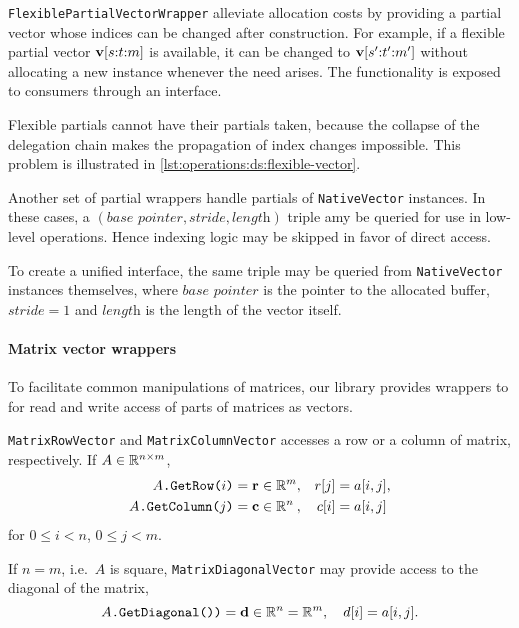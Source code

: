 \texttt{FlexiblePartialVectorWrapper} alleviate allocation costs by
providing a partial vector whose indices can be changed after
construction. For example, if a flexible partial vector
$\bm{\mathrm{v}}[s{:}t{:}m]$ is available, it can be changed to
$\bm{\mathrm{v}}[s'{:}t'{:}m']$ without allocating a new instance
whenever the need arises. The functionality is exposed to consumers
through an interface.

Flexible partials cannot have their partials taken, because the
collapse of the delegation chain makes the propagation of index
changes impossible. This problem is illustrated in
\cref{lst:operations:ds:flexible-vector}.

Another set of partial wrappers handle partials of
\texttt{NativeVector} instances. In these cases, a
$(\textit{base pointer}, \textit{stride}, \textit{length})$ triple amy
be queried for use in low-level operations. Hence indexing logic may
be skipped in favor of direct access.

To create a unified interface, the same triple may be queried from
\texttt{NativeVector} instances themselves, where $\textit{base
  pointer}$ is the pointer to the allocated buffer, $\textit{stride} =
1$ and $\textit{length}$ is the length of the vector itself.

\paragraph{Matrix vector wrappers}

To facilitate common manipulations of matrices, our library provides
wrappers to for read and write access of parts of matrices as
vectors.

\texttt{MatrixRowVector} and \texttt{MatrixColumnVector} accesses a
row or a column of matrix, respectively. If $A \in \mathbb{R}^{n \times m}$,
\begin{align}
  \texttt{$A$.GetRow($i$)} = \mathrlap{\vec{r}}\phantom{\vec{c}} \in \RR^m, \quad
  &r[j] = a[i, j] \text,\\
  \texttt{$A$.GetColumn($j$)} = \vec{c} \in \RR^{\mathrlap{n}\phantom{m}}, \quad
  &\phantom{r[j]}\mathllap{c[i]} = a[i, j]
\end{align}
for $0 \le i < n$, $0 \le j < m$.

If $n = m$, i.e.~$A$ is square, \texttt{MatrixDiagonalVector} may
provide access to the diagonal of the matrix,
\begin{equation}
  \texttt{$A$.GetDiagonal())} = \bm{\mathrm{d}} \in \mathbb{R}^n = \mathbb{R}^m, \quad
  d[i] = a[i, j] \text.
\end{equation}

